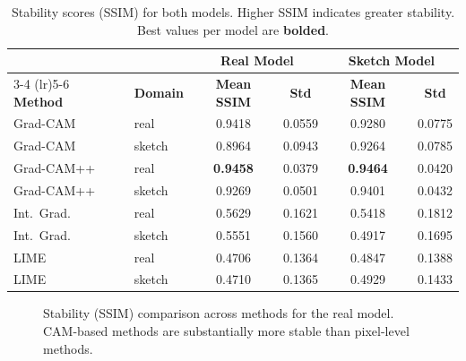 \documentclass[12pt, a4paper]{article}
\begin{document}
\begin{table}[H]
\centering
\caption{Stability scores (SSIM) for both models.  Higher SSIM indicates
greater stability.  Best values per model are \textbf{bolded}.}
\label{tab:stability}
\begin{tabular}{llcccc}
\toprule
& & \multicolumn{2}{c}{\textbf{Real Model}} & \multicolumn{2}{c}{\textbf{Sketch Model}} \\
\cmidrule(lr){3-4} \cmidrule(lr){5-6}
\textbf{Method} & \textbf{Domain} & \textbf{Mean SSIM} & \textbf{Std}
& \textbf{Mean SSIM} & \textbf{Std} \\
\midrule
Grad-CAM   & real   & 0.9418 & 0.0559 & 0.9280 & 0.0775 \\
Grad-CAM   & sketch & 0.8964 & 0.0943 & 0.9264 & 0.0785 \\
Grad-CAM++ & real   & \textbf{0.9458} & 0.0379 & \textbf{0.9464} & 0.0420 \\
Grad-CAM++ & sketch & 0.9269 & 0.0501 & 0.9401 & 0.0432 \\
Int.~Grad. & real   & 0.5629 & 0.1621 & 0.5418 & 0.1812 \\
Int.~Grad. & sketch & 0.5551 & 0.1560 & 0.4917 & 0.1695 \\
LIME       & real   & 0.4706 & 0.1364 & 0.4847 & 0.1388 \\
LIME       & sketch & 0.4710 & 0.1365 & 0.4929 & 0.1433 \\
\bottomrule
\end{tabular}
\end{table}

\begin{figure}[H]
\centering
{}
\caption{Stability (SSIM) comparison across methods for the real model.
CAM-based methods are substantially more stable than pixel-level methods.}
\label{fig:stability_real}
\end{figure}
\end{document}
